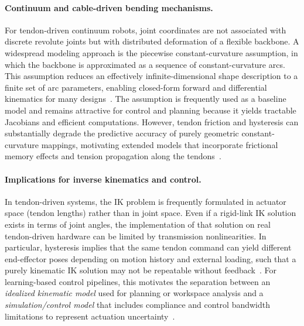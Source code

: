 \paragraph{Continuum and cable-driven bending mechanisms.}
For tendon-driven continuum robots, joint coordinates are not associated with discrete revolute joints but with distributed deformation of a flexible backbone. A widespread modeling approach is the piecewise constant-curvature assumption, in which the backbone is approximated as a sequence of constant-curvature arcs. This assumption reduces an effectively infinite-dimensional shape description to a finite set of arc parameters, enabling closed-form forward and differential kinematics for many designs~\cite{Webster2010ConstantCurvature}. The assumption is frequently used as a baseline model and remains attractive for control and planning because it yields tractable Jacobians and efficient computations. However, tendon friction and hysteresis can substantially degrade the predictive accuracy of purely geometric constant-curvature mappings, motivating extended models that incorporate frictional memory effects and tension propagation along the tendons~\cite{Kato2016Neuroendoscopy}.

\paragraph{Implications for inverse kinematics and control.}
In tendon-driven systems, the \ac{IK} problem is frequently formulated in actuator space (tendon lengths) rather than in joint space. Even if a rigid-link \ac{IK} solution exists in terms of joint angles, the implementation of that solution on real tendon-driven hardware can be limited by transmission nonlinearities. In particular, hysteresis implies that the same tendon command can yield different end-effector poses depending on motion history and external loading, such that a purely kinematic \ac{IK} solution may not be repeatable without feedback~\cite{Kato2016Neuroendoscopy}. For learning-based control pipelines, this motivates the separation between an \emph{idealized kinematic model} used for planning or workspace analysis and a \emph{simulation/control model} that includes compliance and control bandwidth limitations to represent actuation uncertainty~\cite{Miyasaka2020HysteresisFriction}.


